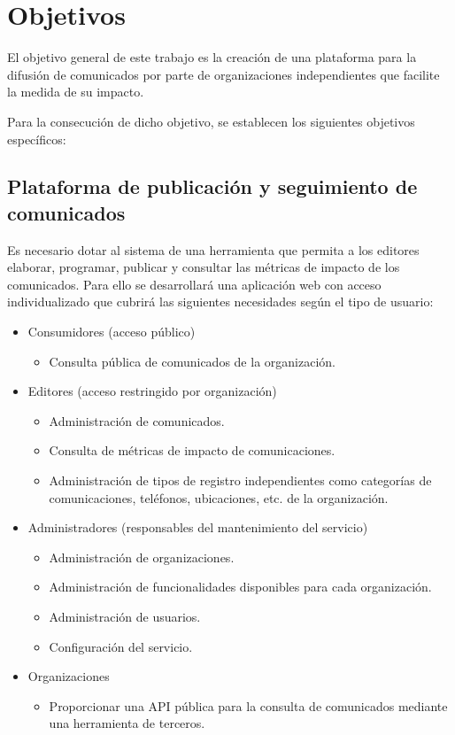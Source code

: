 \section{Objetivos}
El objetivo general de este trabajo es la creación de una plataforma para la difusión de comunicados por parte de organizaciones independientes que facilite la medida de su impacto.

Para la consecución de dicho objetivo, se establecen los siguientes objetivos específicos:

\subsection{Plataforma de publicación y seguimiento de comunicados}
Es necesario dotar al sistema de una herramienta que permita a los editores elaborar, programar, publicar y consultar las métricas de impacto de los comunicados. Para ello se desarrollará una aplicación web con acceso individualizado que cubrirá las siguientes necesidades según el tipo de usuario:
\begin{itemize}
    \item Consumidores (acceso público)
    \begin{itemize}
        \item Consulta pública de comunicados de la organización.
    \end{itemize}
    \item Editores (acceso restringido por organización)
    \begin{itemize}
        \item Administración de comunicados.
        \item Consulta de métricas de impacto de comunicaciones.
        \item Administración de tipos de registro independientes como categorías de comunicaciones, teléfonos, ubicaciones, etc. de la organización.
    \end{itemize}
    \item Administradores (responsables del mantenimiento del servicio)
    \begin{itemize}
        \item Administración de organizaciones.
        \item Administración de funcionalidades disponibles para cada organización.
        \item Administración de usuarios.
        \item Configuración del servicio.
    \end{itemize}
    \item Organizaciones
    \begin{itemize}
        \item Proporcionar una API pública para la consulta de comunicados mediante una herramienta de terceros.
    \end{itemize}
\end{itemize}

